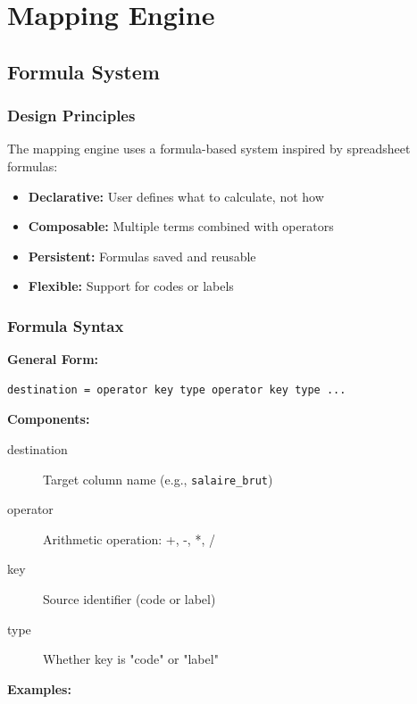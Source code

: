 \chapter{Mapping Engine}

\section{Formula System}

\subsection{Design Principles}

The mapping engine uses a formula-based system inspired by spreadsheet formulas:

\begin{itemize}
    \item \textbf{Declarative:} User defines what to calculate, not how
    \item \textbf{Composable:} Multiple terms combined with operators
    \item \textbf{Persistent:} Formulas saved and reusable
    \item \textbf{Flexible:} Support for codes or labels
\end{itemize}

\subsection{Formula Syntax}

\textbf{General Form:}
\begin{verbatim}
destination = operator key type operator key type ...
\end{verbatim}

\textbf{Components:}
\begin{description}
    \item[destination] Target column name (e.g., \texttt{salaire\_brut})
    \item[operator] Arithmetic operation: +, -, *, /
    \item[key] Source identifier (code or label)
    \item[type] Whether key is "code" or "label"
\end{description}

\textbf{Examples:}

